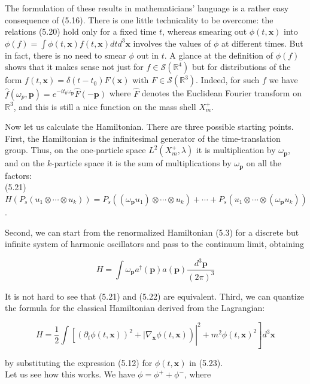 \documentclass[10pt, letterpaper]{article}
\begin{document}
The formulation of these results in mathematicians' language is a rather easy consequence of (5.16). There is one little technicality to be overcome: the relations (5.20) hold only for a fixed time $t$, whereas smearing out $\phi(t, \mathbf{x})$ into $\phi(f)= \int \phi(t, \mathbf{x}) f(t, \mathbf{x}) d t d^{3} \mathbf{x}$ involves the values of $\phi$ at different times. But in fact, there is no need to smear $\phi$ out in $t$. A glance at the definition of $\phi(f)$ shows that it makes sense not just for $f \in \mathcal{S}\left(\mathbb{R}^{4}\right)$ but for distributions of the form $f(t, \mathbf{x})=\delta\left(t-t_{0}\right) F(\mathbf{x})$ with $F \in \mathcal{S}\left(\mathbb{R}^{3}\right)$. Indeed, for such $f$ we have $\widehat{f}\left(\omega_{p}, \mathbf{p}\right)=e^{-i t_{0} \omega_{\mathbf{p}}} \widehat{F}(-\mathbf{p})$ where $\widehat{F}$ denotes the Euclidean Fourier transform on $\mathbb{R}^{3}$, and this is still a nice function on the mass shell $X_{m}^{+}$.

Now let us calculate the Hamiltonian. There are three possible starting points. First, the Hamiltonian is the infinitesimal generator of the time-translation group. Thus, on the one-particle space $L^{2}\left(X_{m}^{+}, \lambda\right)$ it is multiplication by $\omega_{\mathbf{p}}$, and on the $k$-particle space it is the sum of multiplications by $\omega_{\mathbf{p}}$ on all the factors:\\
(5.21) $H\left(P_{s}\left(u_{1} \otimes \cdots \otimes u_{k}\right)\right)=P_{s}\left(\left(\omega_{\mathbf{p}} u_{1}\right) \otimes \cdots \otimes u_{k}\right)+\cdots+P_{s}\left(u_{1} \otimes \cdots \otimes\left(\omega_{\mathbf{p}} u_{k}\right)\right)$.

Second, we can start from the renormalized Hamiltonian (5.3) for a discrete but infinite system of harmonic oscillators and pass to the continuum limit, obtaining

$$
H=\int \omega_{\mathbf{p}} a^{\dagger}(\mathbf{p}) a(\mathbf{p}) \frac{d^{3} \mathbf{p}}{(2 \pi)^{3}}
$$

It is not hard to see that (5.21) and (5.22) are equivalent. Third, we can quantize the formula for the classical Hamiltonian derived from the Lagrangian:

$$
\left.H=\left.\frac{1}{2} \int\left[\left(\partial_{t} \phi(t, \mathbf{x})\right)^{2}+\mid \nabla_{\mathbf{x}} \phi(t, \mathbf{x})\right)\right|^{2}+m^{2} \phi(t, \mathbf{x})^{2}\right] d^{3} \mathbf{x}
$$

by substituting the expression (5.12) for $\phi(t, \mathbf{x})$ in (5.23).\\
Let us see how this works. We have $\phi=\phi^{+}+\phi^{-}$, where
\end{document}
